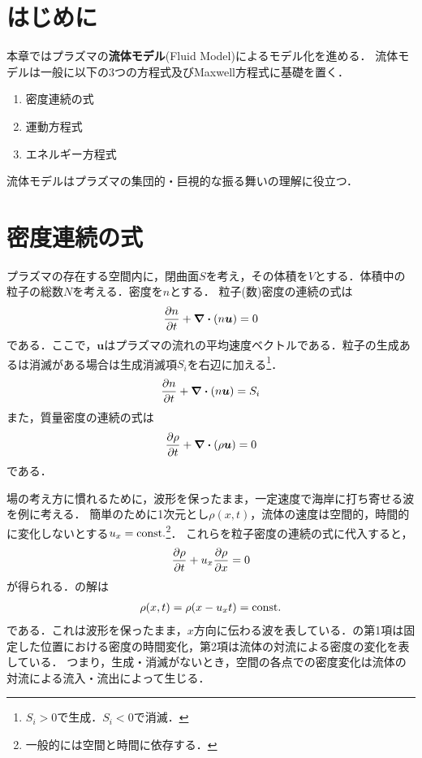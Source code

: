 \documentclass{report}
\begin{document}
  \section{はじめに}
    本章ではプラズマの\textbf{流体モデル}(Fluid Model)によるモデル化を進める．
    流体モデルは一般に以下の3つの方程式及びMaxwell方程式に基礎を置く．
    \begin{enumerate}
      \item 密度連続の式
      \item 運動方程式
      \item エネルギー方程式
    \end{enumerate}
    流体モデルはプラズマの集団的・巨視的な振る舞いの理解に役立つ．
  
  \section{密度連続の式}
    プラズマの存在する空間内に，閉曲面$S$を考え，その体積を$V$とする．体積中の粒子の総数$N$を考える．密度を$n$とする．
    粒子(数)密度の連続の式は
    \begin{align}
      \pdv{n}{t} + \div(n \bm{u}) = 0
    \end{align}
    である．ここで，$\bm{u}$はプラズマの流れの平均速度ベクトルである．粒子の生成あるは消滅がある場合は生成消滅項$S_i$を右辺に加える\footnote{$S_i>0$で生成．$S_i<0$で消滅．}．
    \begin{align}
      \pdv{n}{t} + \div(n \bm{u}) = S_i
    \end{align}
    また，質量密度の連続の式は
    \begin{align}
      \pdv{\rho}{t} + \div(\rho \bm{u}) = 0
    \end{align}
    である．

    場の考え方に慣れるために，波形を保ったまま，一定速度で海岸に打ち寄せる波を例に考える．
    簡単のために1次元とし$\rho(x,t)$，流体の速度は空間的，時間的に変化しないとする$u_x = \mathrm{const.}$\footnote{一般的には空間と時間に依存する．}．
    これらを粒子密度の連続の式に代入すると，
    \begin{align}
      \pdv{\rho}{t} + u_x \pdv{\rho}{x} = 0 \label{eq:cont}
    \end{align}
    が得られる．の解は
    \begin{align}
      \rho(x,t) = \rho(x-u_x t) = \mathrm{const.}
    \end{align}
    である．これは波形を保ったまま，$x$方向に伝わる波を表している．の第1項は固定した位置における密度の時間変化，第2項は流体の対流による密度の変化を表している．
    つまり，生成・消滅がないとき，空間の各点での密度変化は流体の対流による流入・流出によって生じる．
\end{document}
